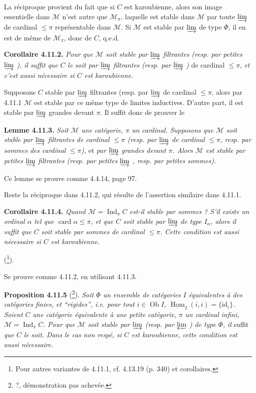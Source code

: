 \documentclass[11pt]{article}
\newcommand{\msp}[1]{\marginpar{\footnotesize [#1]}}
\newcommand{\Hom}{\underline{\operatorname{Hom}}}
\newcommand{\Ind}{\operatorname{Ind}}
\begin{document}
La réciproque provient du fait que si $C$ est karoubienne, alors son image essentielle dans $\mathcal{M}$ n'est autre que $\mathcal{M}_\pi$, laquelle est stable dans $\mathcal{M}$ par toute $\varinjlim$ de cardinal $\leqslant \pi$ représentable dans $\mathcal{M}$. Si $\mathcal{M}$ est stable par $\varinjlim$ de type $\Phi$, il en est de même de $\mathcal{M}_\pi$, donc de $C$, q.e.d.

\textbf{Corollaire 4.11.2.} \textit{Pour que $\mathcal{M}$ soit stable par $\varinjlim$ filtrantes (resp. par petites $\varinjlim$ ), il suffit que $C$ le soit par $\varinjlim$ filtrantes (resp. par $\varinjlim$ )} de cardinal $\leqslant \pi$, \textit{et c'est aussi nécessaire si $C$ est karoubienne.}

Supposons $C$ stable par $\varinjlim$ filtrantes \msp{page 270} (resp. par $\varinjlim$ de cardinal $\leqslant \pi$, alors par 4.11.1 $\mathcal{M}$ est stable par ce même type de limites inductives. D'autre part, il est stable par $\varinjlim$ grandes devant $\pi$. Il suffit donc de prouver le

\textbf{Lemme 4.11.3.} \textit{Soit $\mathcal{M}$ une catégorie, $\pi$ un cardinal. Supposons que $\mathcal{M}$ soit stable par $\varinjlim$ filtrantes de cardinal $\leqslant \pi$ (resp. par $\varinjlim$ de cardinal $\leqslant \pi$, resp. par sommes des cardinal $\leqslant \pi$),} et \textit{par $\varinjlim$ grandes devant $\pi$. Alors $\mathcal{M}$ est stable par petites $\varinjlim$ filtrantes (resp. par petites $\varinjlim$ , resp. par petites sommes).} %

Ce lemme se prouve comme 4.4.14, page 97.

Reste la réciproque dans 4.11.2, qui résulte de l'assertion similaire dans 4.11.1.

\textbf{Corollaire 4.11.4.} \textit{Quand $\mathcal{M} = \Ind_\pi C$ est-il stable par sommes ? S'il existe un ordinal $\alpha$ tel que $\operatorname{card}\alpha \leqslant \pi$, et que $C$ soit stable par $\varinjlim$ de type $I_\alpha$, alors il suffit que $C$ soit stable par sommes de cardinal $\leqslant \pi$. Cette condition est aussi nécessaire si $C$ est karoubienne.}

(\footnote{Pour autres variantes de 4.11.1, cf. 4.13.19 (p. 340) et corollaires.}).

Se prouve comme 4.11.2, en utilisant 4.11.3.

\msp{page 271}

\textbf{Proposition 4.11.5} (\footnote{?, démonstration pas achevée.}). \textit{Soit $\Phi$ un ensemble de catégories $I$ équivalentes à des catégories finies, et “rigides”, i.e. pour tout $i \in \operatorname{Ob} I$, $\Hom_I(i,i) = \{\mathrm{id}_i\}$. Soient $C$ une catégorie équivalente à une petite catégorie, $\pi$ un cardinal infini, $\mathcal{M} = \Ind_\pi C$. Pour que $\mathcal{M}$ soit stable par $\varinjlim$ (resp. par $\varprojlim$ ) de type $\Phi$, il} suffit \textit{que $C$ le soit. Dans le cas non respé, si $C$ est karoubienne, cette condition est aussi nécessaire.}
\end{document}
